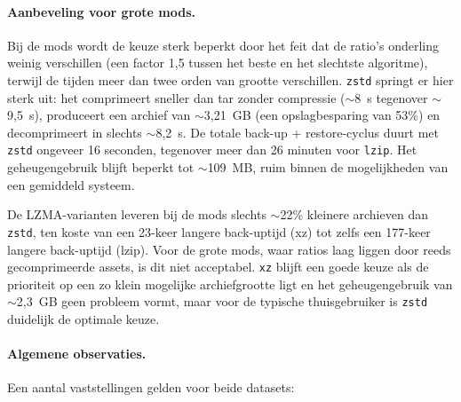 \paragraph{Aanbeveling voor grote mods.}
Bij de mods wordt de keuze sterk beperkt door het feit dat de ratio's onderling weinig verschillen (een factor 1{,}5 tussen het beste en het slechtste algoritme), terwijl de tijden meer dan twee orden van grootte verschillen. \texttt{zstd} springt er hier sterk uit: het comprimeert sneller dan tar zonder compressie ($\sim$8~s tegenover $\sim$9{,}5~s), produceert een archief van $\sim$3{,}21~GB (een opslagbesparing van 53\%) en decomprimeert in slechts $\sim$8{,}2~s. De totale back-up + restore-cyclus duurt met \texttt{zstd} ongeveer 16 seconden, tegenover meer dan 26 minuten voor \texttt{lzip}. Het geheugengebruik blijft beperkt tot $\sim$109~MB, ruim binnen de mogelijkheden van een gemiddeld systeem.

De LZMA-varianten leveren bij de mods slechts $\sim$22\% kleinere archieven dan \texttt{zstd}, ten koste van een 23-keer langere back-uptijd (xz) tot zelfs een 177-keer langere back-uptijd (lzip). Voor de grote mods, waar ratios laag liggen door reeds gecomprimeerde assets, is dit niet acceptabel. \texttt{xz} blijft een goede keuze als de prioriteit op een zo klein mogelijke archiefgrootte ligt en het geheugengebruik van $\sim$2{,}3~GB geen probleem vormt, maar voor de typische thuisgebruiker is \texttt{zstd} duidelijk de optimale keuze.

\paragraph{Algemene observaties.}
Een aantal vaststellingen gelden voor beide datasets:

